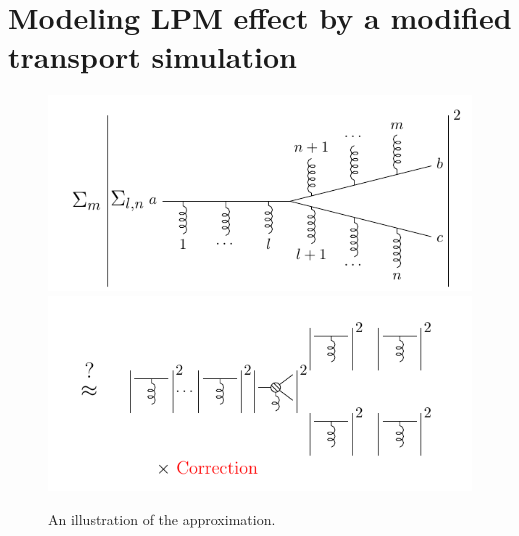 \documentclass[aps, prc, reprint, amsmath, groupedaddress, nofootinbib]{revtex4-1}
\begin{document}
\section{Modeling LPM effect by a modified transport simulation}\label{section:modified-Boltzmann}

\begin{figure}
\includegraphics[width=.4\textwidth]{theo.pdf}
\includegraphics[width=.4\textwidth]{approx.pdf}
\caption{An illustration of the approximation.}
\end{figure}
\end{document}
